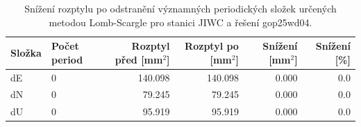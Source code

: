 \begin{table}[htbp]
\caption{Snížení rozptylu po odstranění významných periodických složek určených metodou Lomb-Scargle pro stanici JIWC a řešení gop25wd04.}
\label{tab:gop25wd04_stcd_jiwc_detr_weighted_1seg_spectral_lomb_scargle_variance_reduction}
\begin{tabular}{llrrrr}
\toprule
Složka & Počet period & Rozptyl před [mm$^2$] & Rozptyl po [mm$^2$] & Snížení [mm$^2$] & Snížení [\%] \\
\midrule
dE & 0 & 140.098 & 140.098 & 0.000 & 0.0 \\
dN & 0 & 79.245 & 79.245 & 0.000 & 0.0 \\
dU & 0 & 95.919 & 95.919 & 0.000 & 0.0 \\
\bottomrule
\end{tabular}
\end{table}
